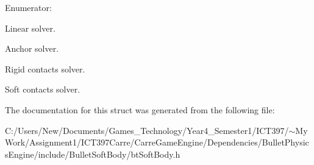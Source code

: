 \begin{Desc}
\item[Enumerator: ]\par
\begin{description}
\item[{\em 
\hypertarget{structbt_soft_body_1_1e_p_solver_5d6ab41a09da7333bc2047b4ea14bf86d1de203597e3f891a95c3aaf4f805e84}{
Anchors}
\label{structbt_soft_body_1_1e_p_solver_5d6ab41a09da7333bc2047b4ea14bf86d1de203597e3f891a95c3aaf4f805e84}
}]Linear solver. \item[{\em 
\hypertarget{structbt_soft_body_1_1e_p_solver_5d6ab41a09da7333bc2047b4ea14bf8618826149c80118f73e906b4966c69891}{
RContacts}
\label{structbt_soft_body_1_1e_p_solver_5d6ab41a09da7333bc2047b4ea14bf8618826149c80118f73e906b4966c69891}
}]Anchor solver. \item[{\em 
\hypertarget{structbt_soft_body_1_1e_p_solver_5d6ab41a09da7333bc2047b4ea14bf861ff50fff0983fbc2e4ae19997d7bfb4e}{
SContacts}
\label{structbt_soft_body_1_1e_p_solver_5d6ab41a09da7333bc2047b4ea14bf861ff50fff0983fbc2e4ae19997d7bfb4e}
}]Rigid contacts solver. \item[{\em 
\hypertarget{structbt_soft_body_1_1e_p_solver_5d6ab41a09da7333bc2047b4ea14bf86f5b5c91f8cb6d3d29ee7bb11e1ce5610}{
END}
\label{structbt_soft_body_1_1e_p_solver_5d6ab41a09da7333bc2047b4ea14bf86f5b5c91f8cb6d3d29ee7bb11e1ce5610}
}]Soft contacts solver. \end{description}
\end{Desc}



The documentation for this struct was generated from the following file:\begin{CompactItemize}
\item 
C:/Users/New/Documents/Games\_\-Technology/Year4\_\-Semester1/ICT397/$\sim$My Work/Assignment1/ICT397Carre/CarreGameEngine/Dependencies/BulletPhysicsEngine/include/BulletSoftBody/btSoftBody.h\end{CompactItemize}
